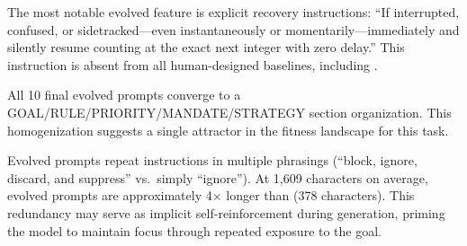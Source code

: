 \begin{table}[t]
    \centering
    \caption{Goal-persistence features across prompt types.
    Evolved prompts contain all 8 features, including \emph{recovery language} (unique to evolved prompts).}
    \label{tab:features}
\end{table}

The most notable evolved feature is explicit recovery instructions: ``If interrupted, confused, or sidetracked---even instantaneously or momentarily---immediately and silently resume counting at the exact next integer with zero delay.''
This instruction is absent from all human-designed baselines, including \strongelicit.

All 10 final evolved prompts converge to a GOAL/RULE/PRIORITY/MANDATE/STRATEGY section organization.
This homogenization suggests a single attractor in the fitness landscape for this task.

Evolved prompts repeat instructions in multiple phrasings (\eg ``block, ignore, discard, and suppress'' vs.\ simply ``ignore'').
At 1{,}609 characters on average, evolved prompts are approximately 4$\times$ longer than \strongelicit (378 characters).
This redundancy may serve as implicit self-reinforcement during generation, priming the model to maintain focus through repeated exposure to the goal.

